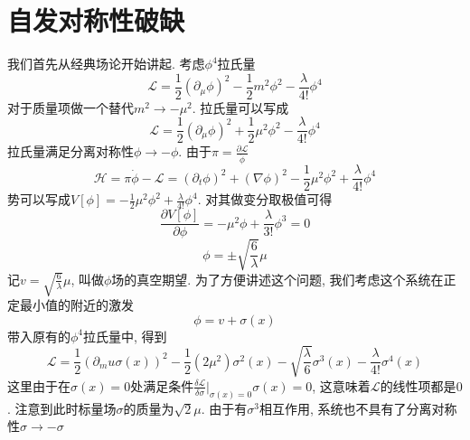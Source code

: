 \documentclass[a4paper,11pt]{article}
\begin{document}
\section{自发对称性破缺}
我们首先从经典场论开始讲起. 考虑$\phi^4$拉氏量
\begin{equation*}
  \mathcal{L}=\frac{1}{2}(\partial_\mu\phi)^2-\frac{1}{2}m^2\phi^2-\frac{\lambda}{4!}\phi^4
\end{equation*}
对于质量项做一个替代$m^2\rightarrow-\mu^2$. 拉氏量可以写成
\begin{equation*}
  \mathcal{L}=\frac{1}{2}(\partial_\mu\phi)^2+\frac{1}{2}\mu^2\phi^2-\frac{\lambda}{4!}\phi^4
\end{equation*}
拉氏量满足分离对称性$\phi\rightarrow-\phi$. 由于$\pi=\frac{\partial\mathcal{L}}{\dot{\phi}}$
\begin{equation*}
  \mathcal{H}=\pi\dot{\phi}-\mathcal{L}=(\partial_t\phi)^2+(\nabla\phi)^2-\frac{1}{2}\mu^2\phi^2+\frac{\lambda}{4!}\phi^4
\end{equation*}
势可以写成$V[\phi]=-\frac{1}{2}\mu^2\phi^2+\frac{\lambda}{4!}\phi^4$. 对其做变分取极值可得
\begin{equation*}
  \frac{\partial V[\phi]}{\partial\phi}=-\mu^2\phi+\frac{\lambda}{3!}\phi^3=0
\end{equation*}
\begin{equation*}
  \phi=\pm\sqrt{\frac{6}{\lambda}}\mu
\end{equation*}
记$v=\sqrt{\frac{6}{\lambda}}\mu$, 叫做$\phi$场的真空期望. 为了方便讲述这个问题, 我们考虑这个系统在正定最小值的附近的激发
\begin{equation*}
  \phi=v+\sigma(x)
\end{equation*}
带入原有的$\phi^4$拉氏量中, 得到
\begin{equation*}
  \mathcal{L}=\frac{1}{2}(\partial_mu\sigma(x))^2-\frac{1}{2}(2\mu^2)\sigma^2(x)-\sqrt{\frac{\lambda}{6}}\sigma^3(x)-\frac{\lambda}{4!}\sigma^4(x)
\end{equation*}
这里由于在$\sigma(x)=0$处满足条件$\frac{\delta\mathcal{L}}{\delta\sigma}|_{\sigma(x)=0}\sigma(x)=0$, 这意味着$\mathcal{L}$的线性项都是$0$. 注意到此时标量场$\sigma$的质量为$\sqrt{2}\mu$. 由于有$\sigma^3$相互作用, 系统也不具有了分离对称性$\sigma\rightarrow-\sigma$
\end{document}
